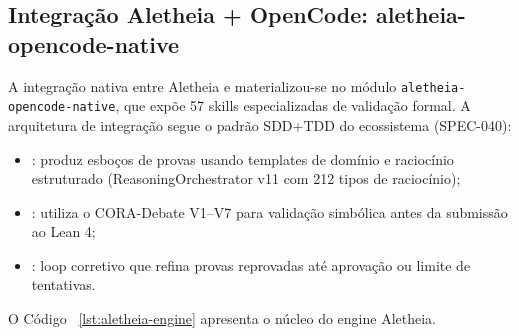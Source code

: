 \begin{table}[htb]
\centering
    \small
\caption{Resultados das Fases Aletheia}
\label{tab:aletheia-phases}
\end{table}

\subsection{Integração Aletheia + OpenCode: aletheia-opencode-native}

A integração nativa entre Aletheia e \opencodeeco{} materializou-se
no módulo \texttt{aletheia-opencode-native}, que expõe 57 skills
especializadas de validação formal. A arquitetura de integração segue
o padrão SDD+TDD do ecossistema (SPEC-040):

\begin{itemize}
\item {}: produz esboços de provas usando templates
de domínio e raciocínio estruturado (ReasoningOrchestrator v11 com
212 tipos de raciocínio);
\item {}: utiliza o CORA-Debate V1--V7 para
validação simbólica antes da submissão ao Lean 4;
\item {}: loop corretivo que refina provas reprovadas
até aprovação ou limite de tentativas.
\end{itemize}

O Código~ \ref{lst:aletheia-engine} apresenta o núcleo do engine
Aletheia.

